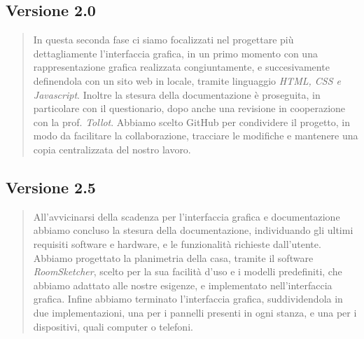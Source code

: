 \documentclass[italian, 12pt, a4paper]{article}
\begin{document}
\subsection{Versione 2.0}
\begin{quote}
    In questa seconda fase ci siamo focalizzati nel progettare più dettagliamente l'interfaccia grafica, in un primo momento con una rappresentazione grafica realizzata congiuntamente, e succesivamente definendola con un sito web in locale, tramite linguaggio \emph{HTML, CSS e Javascript}. Inoltre la stesura della documentazione è proseguita, in particolare con il questionario, dopo anche una revisione in cooperazione con la prof. \emph{Tollot}. Abbiamo scelto GitHub per condividere il progetto, in modo da facilitare la collaborazione, tracciare le modifiche e mantenere una copia centralizzata del nostro lavoro.
\end{quote}
\subsection{Versione 2.5}
\begin{quote}
    All'avvicinarsi della scadenza per l'interfaccia grafica e documentazione abbiamo concluso la stesura della documentazione, individuando gli ultimi requisiti software e hardware, e le funzionalità richieste dall'utente. Abbiamo progettato la planimetria della casa, tramite il software \emph{RoomSketcher}, scelto per la sua facilità d'uso e i modelli predefiniti, che abbiamo adattato alle nostre esigenze, e implementato nell'interfaccia grafica. Infine abbiamo terminato l'interfaccia grafica, suddividendola in due implementazioni, una per i pannelli presenti in ogni stanza, e una per i dispositivi, quali computer o telefoni.
\end{quote}
\clearpage
\end{document}
